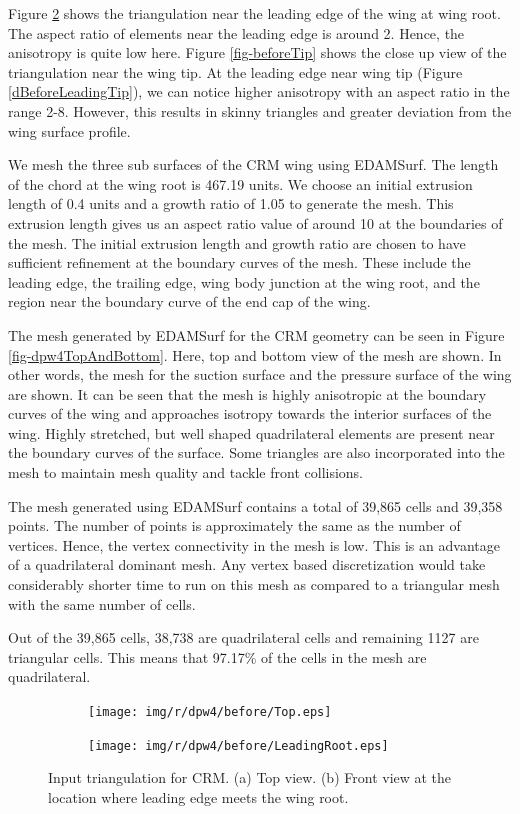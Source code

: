 Figure \ref{dBeforeLeadingRoot} shows the triangulation near the leading edge of the wing at wing root. The aspect ratio of elements near the leading edge is around 2. Hence, the anisotropy is quite low here. Figure \ref{fig-beforeTip} shows the close up view of the triangulation near the wing tip. At the leading edge near wing tip (Figure \ref{dBeforeLeadingTip}), we can notice higher anisotropy with an aspect ratio in the range 2-8. However, this results in skinny triangles and greater deviation from the wing surface profile.

We mesh the three sub surfaces of the CRM wing using EDAMSurf. The length of the chord at the wing root is 467.19 units. We choose an initial extrusion length of 0.4 units and a growth ratio of 1.05 to generate the mesh. This extrusion length gives us an aspect ratio value of around 10 at the boundaries of the mesh. The initial extrusion length and growth ratio are chosen to have sufficient refinement at the boundary curves of the mesh. These include the leading edge, the trailing edge, wing body junction at the wing root, and the region near the boundary curve of the end cap of the wing.

The mesh generated by EDAMSurf for the CRM geometry can be seen in Figure \ref{fig-dpw4TopAndBottom}. Here, top and bottom view of the mesh are shown. In other words, the mesh for the suction surface and the pressure surface of the wing are shown. It can be seen that the mesh is highly anisotropic at the boundary curves of the wing and approaches isotropy towards the interior surfaces of the wing. Highly stretched, but well shaped quadrilateral elements are present near the boundary curves of the surface. Some triangles are also incorporated into the mesh to maintain mesh quality and tackle front collisions.

The mesh generated using EDAMSurf contains a total of 39,865 cells and 39,358 points. The number of points is approximately the same as the number of vertices. Hence, the vertex connectivity in the mesh is low. This is an advantage of a quadrilateral dominant mesh. Any vertex based discretization would take considerably shorter time to run on this mesh as compared to a triangular mesh with the same number of cells.

Out of the 39,865 cells, 38,738 are quadrilateral cells and remaining 1127 are triangular cells. This means that 97.17\% of the cells in the mesh are quadrilateral.



\begin{figure}[!hbt]
	\centering
	\begin{subfigure}{\textwidth}
		\centering
		\texttt{[image: img/r/dpw4/before/Top.eps]}
		\caption{}
		\label{dBeforeTop}
	\end{subfigure}
	\begin{subfigure}{\textwidth}
		\centering
		\texttt{[image: img/r/dpw4/before/LeadingRoot.eps]}
		\caption{}
		\label{dBeforeLeadingRoot}
	\end{subfigure}
	\caption[Input triangulation for CRM.]{Input triangulation for CRM. (a) Top view. (b) Front view at the location where leading edge meets the wing root.}
	\label{fig-beforeTop}
\end{figure}

